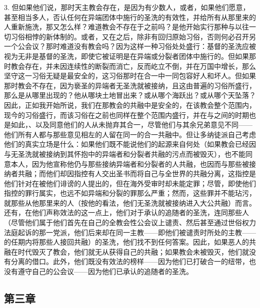 3. 但如果他们说，那时天主教会存在，是因为有少数人，或者，如果他们愿意，甚至相当多人，否认任何在异端团体中施行的圣洗的有效性，并给所有从那里来的人重新施洗，那又怎么样？难道教会不存在于之前吗？是他开始实行那种与以往一切习俗相悖的新体制的。或者，又在之后，除非有回归原始习俗，否则何必召开另一个公会议？那时难道没有教会吗？因为这样一种习俗处处盛行：基督的圣洗应被视为无非是基督的圣洗，即使它被证明是在异端或分裂者团体中施行的。但如果那时教会存在，并未因连续性的断裂而消亡，反而屹立不倒，并在万国中增长，那么坚守这一习俗无疑是最安全的，这习俗那时在合一中一同包容好人和坏人。但如果那时教会不存在，因为亵圣的异端者无圣洗就被接纳，且这由普遍的习俗所盛行，那么是从哪里出现的？他从哪块土地冒出来？或从哪个海跃出？或从哪个天坠落？因此，正如我开始所说，我们在那教会的共融中是安全的，在该教会整个范围内，现今的习俗盛行，而该习俗在之前也同样在整个范围内盛行，并在与之间的时期也是如此，、以及同意他们的人从未抛弃其合一，尽管他们与其余兄弟意见不同——他们所有人都与那些意见相左的人留在同一的合一共融中。但让多纳徒派自己考虑他们的真实立场是什么：如果他们既不能说他们的起源来自何处（如果教会已经因与无圣洗就被接纳到其怀抱中的异端者和分裂者共融的污点而被毁灭），也不能同意本人，因为他宣称他仍与那些接纳异端者和分裂者的人共融，也因而与那些被接纳者共融；而他们却因指控有人交出圣书而将自己与全世界的共融分离，这指控是他们针对在被他们诽谤的人提出的，但在海外受审时却未能定罪；尽管，即使他们指控的罪行属实，也远不如异端和分裂的罪那么严重；然而，这些罪并不能玷污，就那些从他那里来的人（按他的看法，他们无圣洗就被接纳进入大公共融）而言。还有，在他们声称效法的这一点上，他们对于承认的追随者的圣洗，连同那些人（尽管他们属于他们首先在自己的全教会性公会议上谴责、然后甚至通过世俗权力法庭起诉的那一党派，他们后来却在同一主教——即他们被谴责时所处的主教——的任期内将那些人接回共融）的圣洗，他们找不到任何答案。因此，如果恶人的共融在时代毁灭了教会，他们就无从获得自己的共融；如果教会未被毁灭，他们就没有分离的借口。此外，他们既没有效法的榜样——因为他们已打破合一的纽带，也没有遵守自己的公会议——因为他们已承认的追随者的圣洗。\par


\subsection{第三章}


